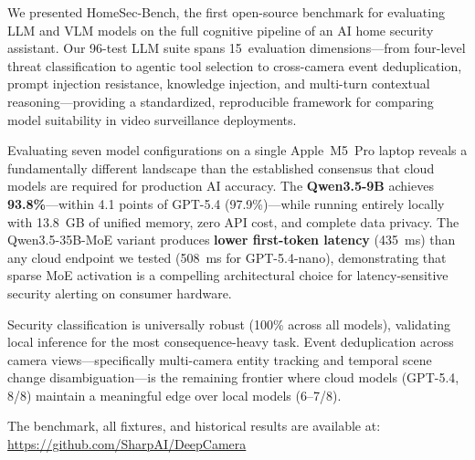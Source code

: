 \documentclass[onecolumn,10pt]{IEEEtran}
\begin{document}
We presented HomeSec-Bench, the first open-source benchmark for evaluating
LLM and VLM models on the full cognitive pipeline of an AI home security
assistant. Our 96-test LLM suite spans 15~evaluation dimensions---from
four-level threat classification to agentic tool selection to cross-camera
event deduplication, prompt injection resistance, knowledge injection, and
multi-turn contextual reasoning---providing a standardized, reproducible
framework for comparing model suitability in video surveillance deployments.

Evaluating seven model configurations on a single Apple~M5~Pro laptop
reveals a fundamentally different landscape than the established
consensus that cloud models are required for production AI accuracy.
The \textbf{Qwen3.5-9B} achieves \textbf{93.8\%}---within 4.1 points
of GPT-5.4 (97.9\%)---while running entirely locally with 13.8~GB of
unified memory, zero API cost, and complete data privacy. The
Qwen3.5-35B-MoE variant produces \textbf{lower first-token latency}
(435~ms) than any cloud endpoint we tested (508~ms for GPT-5.4-nano),
demonstrating that sparse MoE activation is a compelling architectural
choice for latency-sensitive security alerting on consumer hardware.

Security classification is universally robust (100\% across all models),
validating local inference for the most consequence-heavy task.
Event deduplication across camera views---specifically multi-camera
entity tracking and temporal scene change disambiguation---is the
remaining frontier where cloud models (GPT-5.4, 8/8) maintain a
meaningful edge over local models (6--7/8).

The benchmark, all fixtures, and historical results are available at:
\url{https://github.com/SharpAI/DeepCamera}



\end{document}
